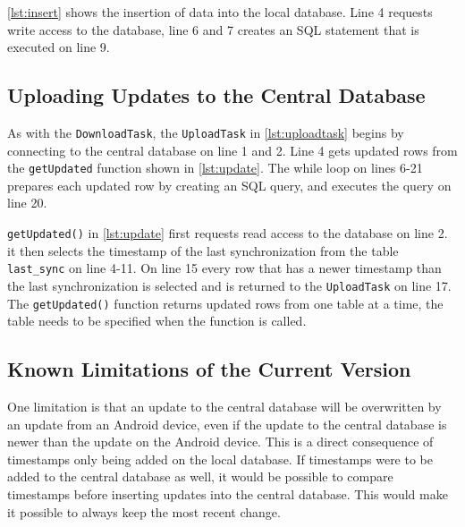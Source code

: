 

\autoref{lst:insert} shows the insertion of data into the local database. Line 4 requests write access to the database, line 6 and 7 creates an SQL statement that is executed on line 9. 



\subsection{Uploading Updates to the Central Database}
As with the \lstinline|DownloadTask|, the \lstinline|UploadTask| in \autoref{lst:uploadtask} begins by connecting to the central database on line 1 and 2. Line 4 gets updated rows from the \lstinline|getUpdated| function shown in \autoref{lst:update}. The while loop on lines 6-21 prepares each updated row by creating an SQL query, and executes the query on line 20.



\lstinline|getUpdated()| in \autoref{lst:update} first requests read access to the database on line 2. it then selects the timestamp of the last synchronization from the table \lstinline|last_sync| on line 4-11. On line 15 every row that has a newer timestamp than the last synchronization is selected and is returned to the \lstinline|UploadTask| on line 17. The \lstinline|getUpdated()| function returns updated rows from one table at a time, the table needs to be specified when the function is called.



\subsection{Known Limitations of the Current Version}
One limitation is that an update to the central database will be overwritten 
by an update from an Android device, even if the update to the central database is newer 
than the update on the Android device. This is a direct consequence of timestamps only 
being added on the local database. If timestamps were to be added to the central database 
as well, it would be possible to compare timestamps before inserting updates into the central
database. This would make it possible to always keep the most recent change.

